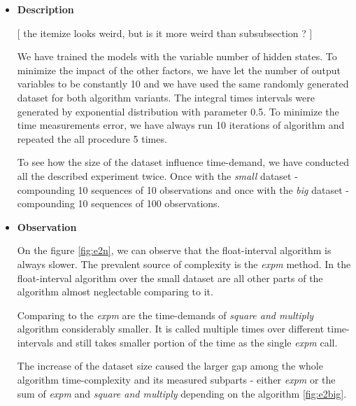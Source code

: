 \documentclass[thesis=M,english]{FITthesis}[2012/10/20]
\begin{document}
\begin{itemize}
\item \textbf{ Description }

[ the itemize looks weird, but is it more weird than subsubsection ? ] %

We have trained the models with the variable number of hidden states. To minimize the impact of the other factors, we have let the number of output variables to be constantly 10 and we have used the same randomly generated dataset for both algorithm variants. The integral times intervals were generated by exponential distribution with parameter 0.5. To minimize the time measurements error, we have always run 10 iterations of algorithm and repeated the all procedure 5 times. 

To see how the size of the dataset influence time-demand, we have conducted all the described experiment twice. Once with the \textit{small} dataset - compounding 10 sequences of 10 observations and once with the \textit{big} dataset - compounding 10 sequences of 100 observations.  

\item \textbf{ Observation }

On the figure \ref{fig:e2n}, we can observe that the float-interval algorithm is always slower. The prevalent source of complexity is the \textit{expm} method. In the float-interval algorithm over the small dataset are all other parts of the algorithm almost neglectable comparing to it.

Comparing to the \textit{expm} are the time-demands of \textit{square and multiply} algorithm considerably smaller. It is called multiple times over different time-intervals and still takes smaller portion of the time as the single \textit{expm} call.

The increase of the dataset size caused the larger gap among the whole algorithm time-complexity and its measured subparts - either \textit{expm} or the sum of \textit{expm} and \textit{square and multiply} depending on the algorithm \ref{fig:e2big}.   


\end{itemize}
\end{document}
